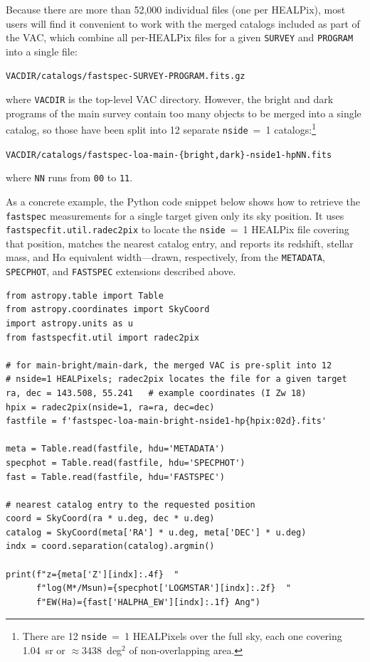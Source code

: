 \documentclass[modern,linenumbers]{aastex701}
\newcommand{\fastspec}{\texttt{fastspec}}
\newcommand{\ha}{H\ensuremath{\alpha}}
\begin{document}
Because there are more than 52,000 individual files (one per HEALPix),
most users will find it convenient to work with the merged catalogs
included as part of the VAC, which combine all per-HEALPix files for a
given \texttt{SURVEY} and \texttt{PROGRAM} into a single file:

\medskip
\noindent\texttt{VACDIR/catalogs/fastspec-SURVEY-PROGRAM.fits.gz}
\medskip

\noindent where \texttt{VACDIR} is the top-level VAC
directory. However, the bright and dark programs of the main survey
contain too many objects to be merged into a single catalog, so those
have been split into 12 separate \texttt{nside}~=~1
catalogs:\footnote{There are 12 \texttt{nside}~=~1 HEALPixels over the
full sky, each one covering 1.04~sr or $\approx3438$~deg$^{2}$ of
non-overlapping area.}

\medskip
\noindent\texttt{VACDIR/catalogs/fastspec-loa-main-\{bright,dark\}-nside1-hpNN.fits}
\medskip

\noindent where \texttt{NN} runs from \texttt{00} to \texttt{11}.

As a concrete example, the Python code snippet below shows how to
retrieve the \fastspec{} measurements for a single target given only
its sky position. It uses \texttt{fastspecfit.util.radec2pix} to
locate the \texttt{nside}~=~1 HEALPix file covering that position,
matches the nearest catalog entry, and reports its redshift, stellar
mass, and \ha{} equivalent width---drawn, respectively, from the
\texttt{METADATA}, \texttt{SPECPHOT}, and \texttt{FASTSPEC} extensions
described above.

\begin{verbatim}
from astropy.table import Table
from astropy.coordinates import SkyCoord
import astropy.units as u
from fastspecfit.util import radec2pix

# for main-bright/main-dark, the merged VAC is pre-split into 12
# nside=1 HEALPixels; radec2pix locates the file for a given target
ra, dec = 143.508, 55.241   # example coordinates (I Zw 18)
hpix = radec2pix(nside=1, ra=ra, dec=dec)
fastfile = f'fastspec-loa-main-bright-nside1-hp{hpix:02d}.fits'

meta = Table.read(fastfile, hdu='METADATA')
specphot = Table.read(fastfile, hdu='SPECPHOT')
fast = Table.read(fastfile, hdu='FASTSPEC')

# nearest catalog entry to the requested position
coord = SkyCoord(ra * u.deg, dec * u.deg)
catalog = SkyCoord(meta['RA'] * u.deg, meta['DEC'] * u.deg)
indx = coord.separation(catalog).argmin()

print(f"z={meta['Z'][indx]:.4f}  "
      f"log(M*/Msun)={specphot['LOGMSTAR'][indx]:.2f}  "
      f"EW(Ha)={fast['HALPHA_EW'][indx]:.1f} Ang")
\end{verbatim}
\end{document}

